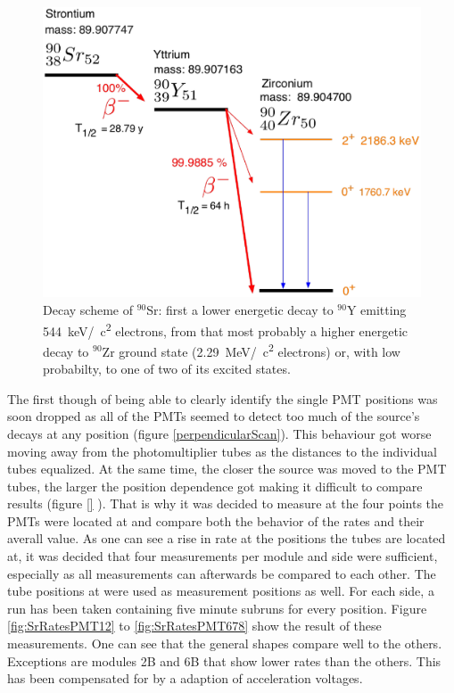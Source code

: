   \begin{figure}
  \centering
   	\includegraphics[width = 0.5 \textwidth]{graphics/cobalt/Sr90_decay.eps}
  	\caption[Cobalt decay scheme]{Decay scheme of $^{90}$Sr: first a lower energetic decay to $^{90}$Y emitting \SI{544}{\kilo\electronvolt}/\SI{}{\square c} electrons, from that most probably a higher energetic decay to $^{90}$Zr ground state (\SI{2.29}{\mega\electronvolt}/\SI{}{\square c} electrons) or, with low probabilty, to one of two of its excited states.}
  \end{figure}
  The first though of being able to clearly identify the single PMT positions was soon dropped as all of the PMTs seemed to detect too much of the source's decays at any position (figure \ref{perpendicularScan}).
  This behaviour got worse moving away from the photomultiplier tubes as the distances to the individual tubes equalized. At the same time, the closer the source was moved to the PMT tubes, the larger the position dependence got making it difficult to compare results (figure \ref{} ).
  That is why it was decided to measure at the four points the PMTs were located at and compare both the behavior of the rates and their averall value.
  As one can see a rise in rate at the positions the tubes are located at, it was decided that four measurements per module and side were sufficient, especially as all measurements can afterwards be compared to each other.
  The tube positions at  were used as measurement positions as well. For each side, a run has been taken containing five minute subruns for every position. Figure \ref{fig:SrRatesPMT12} to \ref{fig:SrRatesPMT678} show the result of these measurements. One can see that the general shapes compare well to the others. Exceptions are modules 2B and 6B that show lower rates than the others. This has been compensated for by a adaption of acceleration voltages.
 
